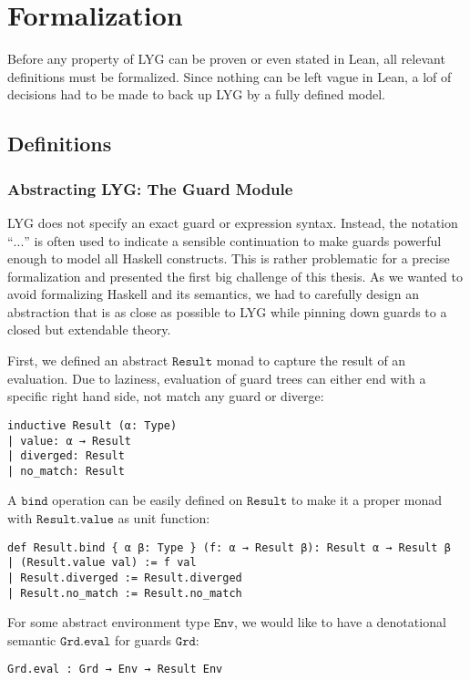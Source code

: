 \chapter{Formalization}\label{sec:formalization}

Before any property of LYG can be proven or even stated in Lean, all relevant definitions must be formalized.
Since nothing can be left vague in Lean, a lof of decisions had to be made to back up LYG by a fully defined model. 

\section{Definitions}

\subsection{Abstracting LYG: The Guard Module}
LYG does not specify an exact guard or expression syntax.
Instead, the notation ``$...$'' is often used to indicate a sensible continuation to make guards powerful enough to model all Haskell constructs.
This is rather problematic for a precise formalization and presented the first big challenge of this thesis.
As we wanted to avoid formalizing Haskell and its semantics, we had to carefully design an abstraction that is as close as possible to LYG
while pinning down guards to a closed but extendable theory.

First, we defined an abstract $\mathtt{Result}$ monad to capture the result of an evaluation.
Due to laziness, evaluation of guard trees can either end with a specific right hand side, not match any guard or diverge:

\begin{verbatim}
inductive Result (α: Type)
| value: α → Result
| diverged: Result
| no_match: Result
\end{verbatim}

A $\mathtt{bind}$ operation can be easily defined on $\mathtt{Result}$ to make it a proper monad with $\mathtt{Result.value}$ as unit function:

\begin{verbatim}
def Result.bind { α β: Type } (f: α → Result β): Result α → Result β
| (Result.value val) := f val
| Result.diverged := Result.diverged
| Result.no_match := Result.no_match
\end{verbatim}

For some abstract environment type $\mathtt{Env}$, we would like to have a denotational semantic $\mathtt{Grd.eval}$ for guards $\mathtt{Grd}$:
\begin{verbatim}
Grd.eval : Grd → Env → Result Env
\end{verbatim}

